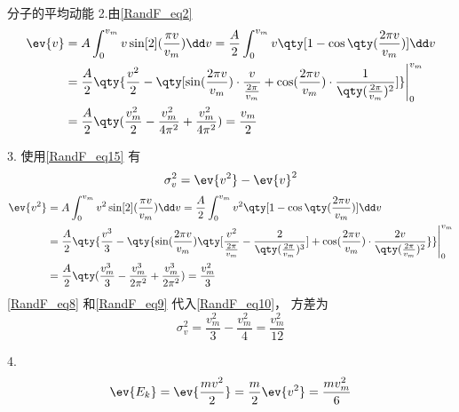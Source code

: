 \begin{example}{分子的平均动能}
2.由\autoref{RandF_eq2} 
\begin{equation}\label{RandF_eq8}
\begin{aligned}
\ev{v}&=A\int_{0}^{v_{m}} v\sin[2](\frac{\pi v}{v_{m}})\dd v=\frac{A}{2}\int_0^{v_m}v\qty[1-\cos\qty(\frac{2\pi v}{v_{m}})]\dd v\\
&=\frac{A}{2}\qty{\frac{v^2}{2}-\qty[\sin(\frac{2\pi v}{v_{m}})\cdot\frac{v}{\frac{2\pi}{v_m}}+\cos(\frac{2\pi v}{v_{m}})\cdot\frac{1}{\qty(\frac{2\pi}{v_m})^2}]}\Bigg|_{0}^{v_{m}}\\
&=\frac{A}{2}\qty(\frac{v_{m}^2}{2}-\frac{v_{m}^2}{4\pi^2}+\frac{v_{m}^2}{4\pi^2})=\frac{v_{m}}{2}
\end{aligned}
\end{equation}

3. 使用\autoref{RandF_eq15} 有
\begin{equation}\label{RandF_eq10}
\sigma_v^2=\ev{v^2}-\ev{v}^2
\end{equation}
\begin{equation}\label{RandF_eq9}
\begin{aligned}
\ev{v^2}&=A\int_{0}^{v_{m}} v^2\sin[2](\frac{\pi v}{v_{m}})\dd v=\frac{A}{2}\int_{0}^{v_{m}}v^2\qty[1-\cos\qty(\frac{2\pi v}{v_{m}})]\dd v\\
&=\frac{A}{2}\qty{\frac{v^3}{3}-\qty{\sin(\frac{2\pi v}{v_{m}})\qty[\frac{v^2}{\frac{2\pi }{v_{m}}}-\frac{2}{\qty(\frac{2\pi }{v_{m}})^3}]+\cos(\frac{2\pi v}{v_{m}})\cdot\frac{2v}{\qty(\frac{2\pi}{v_{m}})^2}}}\Bigg|_0^{v_{m}}\\
&=\frac{A}{2}\qty(\frac{v_m^3}{3}-\frac{v_{m}^3}{2\pi^2}+\frac{v_{m}^3}{2\pi^2})=\frac{v_{m}^2}{3}
\end{aligned}
\end{equation}
\autoref{RandF_eq8} 和\autoref{RandF_eq9} 代入\autoref{RandF_eq10}， 方差为
\begin{equation}
\sigma_v^2=\frac{v_{m}^2}{3}-\frac{v_{m}^2}{4}=\frac{v_m^2}{12}
\end{equation}

4.
\begin{equation}\label{RandF_eq11}
\ev{E_k}=\ev{\frac{mv^2}{2}}=\frac{m}{2}\ev{v^2}=\frac{mv_{m}^2}{6}
\end{equation}


\end{example}
